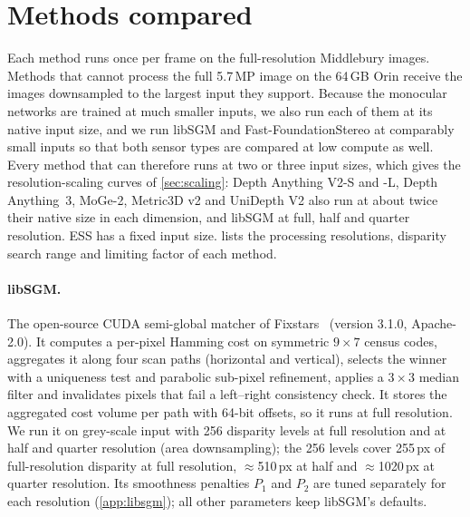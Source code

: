 \documentclass[10pt,twocolumn]{article}
\begin{document}
\section{Methods compared}
\label{sec:methods}
Each method runs once per frame on the full-resolution Middlebury images. Methods that cannot process
the full 5.7\,MP image on the 64\,GB Orin receive the images downsampled to the largest input they
support. Because the monocular networks are trained at much smaller inputs, we also run each of them at
its native input size, and we run libSGM and Fast-FoundationStereo at comparably small inputs so
that both sensor types are compared at low compute as well. Every method that can therefore runs at
two or three input sizes, which gives the resolution-scaling curves of \cref{sec:scaling}: Depth
Anything V2-S and -L, Depth Anything~3, MoGe-2, Metric3D v2 and UniDepth V2 also run at about twice
their native size in each dimension, and libSGM at full, half and quarter resolution. ESS has a fixed
input size.
 lists the processing resolutions, disparity search range and limiting factor of each
method.

\begin{table}[!t]
\centering
\caption{Configuration of each method. All methods receive the same full-resolution (${\approx}$5.7\,MP)
images and are scored against full-resolution ground truth; methods that cannot process 5.7\,MP on the
64\,GB Jetson AGX Orin run at their maximum input size. Full-resolution equivalents assume a 2880\,px
wide image.}
\label{tab:res}
\small

\end{table}

\paragraph{libSGM.} The open-source CUDA semi-global matcher of Fixstars~\cite{fixstars2024libsgm}
(version 3.1.0, Apache-2.0). It computes a per-pixel Hamming cost on symmetric $9\times7$ census codes,
aggregates it along four scan paths (horizontal and vertical), selects the winner with a uniqueness
test and parabolic sub-pixel refinement, applies a $3\times3$ median filter and invalidates pixels that
fail a left--right consistency check. It stores the aggregated cost volume per path with 64-bit
offsets, so it runs at full resolution. We run it on grey-scale input with 256 disparity levels at
full resolution and at half and quarter resolution (area downsampling); the 256 levels cover 255\,px of
full-resolution disparity at full resolution, ${\approx}$510\,px at half and ${\approx}$1020\,px at
quarter resolution. Its smoothness penalties $P_1$ and $P_2$ are tuned separately for each resolution
(\cref{app:libsgm}); all other parameters keep libSGM's defaults.
\end{document}
